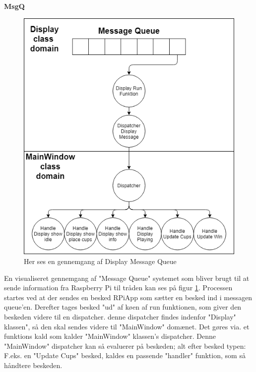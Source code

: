 \documentclass[Softwaredesign/Softwaredesign_main.tex]{subfiles}
\begin{document}
\textbf{MsgQ}
\begin{figure}[H]
    \centering
    \includegraphics[scale=0.5]{Softwaredesign/GUI/Pictures/Display_MsgQ.png}
    \caption{Her ses en gennemgang af Display Message Queue}
    \label{displaymsgq}
\end{figure}

En visualiseret gennemgang af "Message Queue" systemet som bliver brugt til at sende information fra Raspberry Pi til tråden kan ses på figur \ref{displaymsgq}. Processen startes ved at der sendes en besked RPiApp som sætter en besked ind i messagen queue'en. Derefter tages besked "ud" af køen af run funktionen, som giver den beskeden videre til en dispatcher. denne dispatcher findes indenfor "Display" klassen", så den skal sendes videre til "MainWindow" domænet. Det gøres via. et funktions kald som kalder "MainWindow" klassen's dispatcher.  Denne "MainWindow" dispatcher kan så evaluerer på beskeden; alt efter besked typen: F.eks. en "Update Cups" besked, kaldes en passende "handler" funktion, som så håndtere beskeden. 
\end{document}
